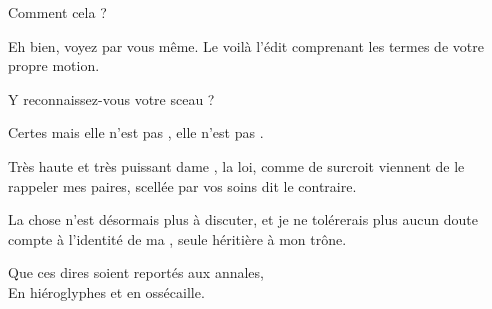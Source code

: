 \begin{drama}
  \reinespeaks Comment cela ?

  \nobleOnespeaks Eh bien, voyez par vous même. Le voilà l’édit comprenant les termes de votre propre motion.

  \nobleTwospeaks Y reconnaissez-vous votre sceau ?

  \reinespeaks Certes mais elle n’est pas \princesse, elle n’est pas \princesse.

  \nobleOnespeaks Très haute et très puissant dame \reine, la loi, comme de surcroit viennent de le rappeler mes paires, scellée par vos soins dit le contraire.

  \roispeaks La chose n’est désormais plus à discuter, et je ne tolérerais plus  aucun doute compte à l’identité de ma \princesse, seule héritière à mon trône.

  \begin{minipage}[t]{\linewidth}
    Que ces dires soient reportés aux annales,\\
    En hiéroglyphes et en ossécaille.
  \end{minipage}
\end{drama}


\scene

\StageDirII{\elena, \alexas}


